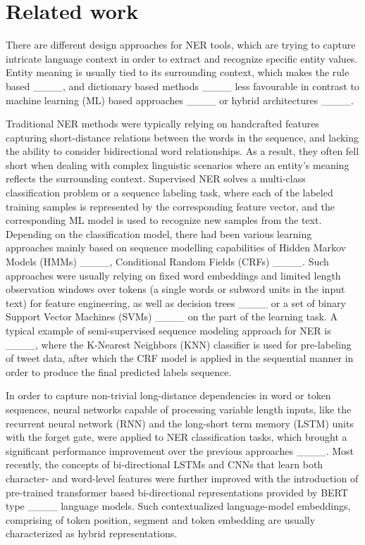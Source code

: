 \section{Related work}
\label{Related work}

There are different design approaches for NER tools, which are trying to capture intricate language context in order to extract and recognize specific entity values. Entity meaning is usually tied to its surrounding context, which makes the rule based ____, and dictionary based methods ____ less favourable in contrast to machine learning (ML) based approaches ____ or hybrid architectures ____.

Traditional NER methods were typically relying on handcrafted features capturing short-distance relations between the words in the sequence, and lacking the ability to consider bidirectional word relationships. As a result, they often fell short when dealing with complex linguistic scenarios where an entity's meaning reflects the surrounding context. Supervised NER solves a multi-class classification problem or a sequence labeling task, where each of the labeled training samples is represented by the corresponding feature vector, and the corresponding ML model is used to recognize new samples from the text. Depending on the classification model, there had been various learning approaches mainly based on sequence modelling capabilities of Hidden Markov Models (HMMs) ____, Conditional Random Fields (CRFs) ____.  Such approaches were usually relying on fixed word embeddings and limited length observation windows over tokens (a single words or subword units in the input text) for feature engineering, as well as decision trees ____ or a set of binary Support Vector Machines (SVMs) ____ on the part of the learning task. A typical example of semi-supervised sequence modeling approach for NER is ____, where the K-Nearest Neighbors (KNN) classifier is used for pre-labeling of tweet data, after which the CRF model is applied in the sequential manner in order to produce the final predicted labels sequence.

In order to capture non-trivial long-distance dependencies in word or token sequences, neural networks capable of processing variable length inputs, like the recurrent neural network (RNN) and the long-short term memory (LSTM) units with the forget gate, were applied to NER classification tasks, which brought a significant performance improvement over the previous approaches ____. Most recently, the concepts of bi-directional LSTMs and CNNs that learn both character- and word-level features were further improved with the introduction of pre-trained transformer based bi-directional representations provided by BERT type ____ language models. Such contextualized language-model embeddings, comprising of token position, segment and token embedding are usually characterized as hybrid representations.

